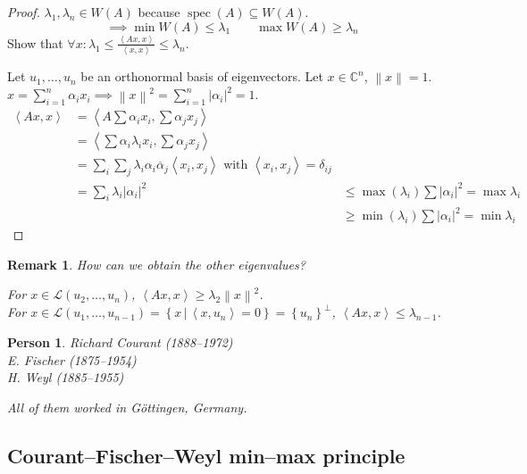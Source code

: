 \documentclass{article}
\newcounter{lecref}[section]
\numberwithin{lecref}{section}
\newtheorem{remark}[lecref]{Remark}
\newtheorem*{person}{Person}
\newcommand{\set}[1]{\left\{#1\right\}}
\newcommand{\setdef}[2]{\left\{\left.#1\,\right|\,#2\right\}}
\newcommand{\angel}[1]{\left\langle#1\right\rangle}
\newcommand{\norm}[1]{\left\|#1\right\|}
\newcommand{\card}[1]{\left|#1\right|}
\begin{document}
\begin{proof}
  $\lambda_1, \lambda_n \in W(A)$ because $\operatorname{spec}(A) \subseteq W(A)$.
  \[ \implies \min{W(A)} \leq \lambda_1 \qquad \max{W(A)} \geq \lambda_n \]
  Show that $\forall x: \lambda_1 \leq \frac{\angel{Ax, x}}{\angel{x, x}} \leq \lambda_n$.

  Let $u_1, \dots, u_n$ be an orthonormal basis of eigenvectors.
  Let $x \in \mathbb C^n$, $\norm{x} = 1$. $x = \sum_{i=1}^n \alpha_i x_i \implies \norm{x}^2 = \sum_{i=1}^n \card{\alpha_i}^2 = 1$.
  \begin{align*}
    \angel{Ax, x} &= \angel{A \sum \alpha_i x_i, \sum \alpha_j x_j} \\
      &= \angel{\sum \alpha_i \lambda_i x_i, \sum \alpha_j x_j} \\
      &= \sum_{i} \sum_{j} \lambda_i \alpha_i \overline{\alpha}_j \angel{x_i, x_j} \text { with } \angel{x_i, x_j} = \delta_{ij} \\
      &= \sum_{i} \lambda_i \card{\alpha_i}^2  & \leq \max(\lambda_i) \sum \card{\alpha_i}^2 = \max{\lambda_i} \\
      &                                        &\geq \min(\lambda_i) \sum \card{\alpha_i}^2 = \min{\lambda_i}
  \end{align*}
\end{proof}

\begin{remark} %
  How can we obtain the other eigenvalues?

  For $x \in \mathcal L(u_2, \dots, u_n)$, $\angel{Ax, x} \geq \lambda_2 \norm{x}^2$. \\
  For $x \in \mathcal L(u_1, \dots, u_{n-1}) = \setdef{x}{\angel{x, u_n} = 0} = \set{u_n}^\bot$, $\angel{Ax, x} \leq \lambda_{n-1}$.
\end{remark}

\begin{person}
  Richard Courant (1888--1972) \\
  E. Fischer (1875--1954) \\
  H. Weyl (1885--1955)

  All of them worked in G\"ottingen, Germany.
\end{person}

\subsection{Courant--Fischer--Weyl min--max principle}
\end{document}
